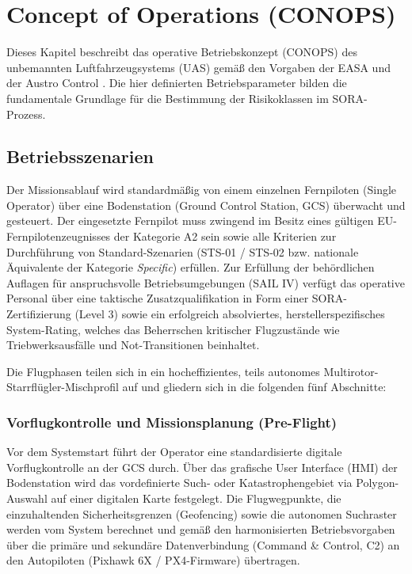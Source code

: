 ﻿\chapter{Concept of Operations (CONOPS)}
\label{ch:conops}

Dieses Kapitel beschreibt das operative Betriebskonzept (CONOPS) des unbemannten Luftfahrzeugsystems (UAS) gemäß den Vorgaben der EASA \cite{easa_rules} und der Austro Control \cite{austrocontrol_sora}. 
Die hier definierten Betriebsparameter bilden die fundamentale Grundlage für die Bestimmung der Risikoklassen im SORA-Prozess.

\section{Betriebsszenarien}
\label{sec:betriebsszenarien}

Der Missionsablauf wird standardmäßig von einem einzelnen Fernpiloten (Single Operator) über eine Bodenstation (Ground Control Station, GCS) überwacht und gesteuert. 
Der eingesetzte Fernpilot muss zwingend im Besitz eines gültigen EU-Fernpilotenzeugnisses der Kategorie A2 sein sowie alle Kriterien zur Durchführung von Standard-Szenarien 
(STS-01 / STS-02 bzw. nationale Äquivalente der Kategorie \textit{Specific}) erfüllen. Zur Erfüllung der behördlichen Auflagen für anspruchsvolle Betriebsumgebungen (SAIL IV) 
verfügt das operative Personal über eine taktische Zusatzqualifikation in Form einer SORA-Zertifizierung (Level 3) sowie ein erfolgreich absolviertes, herstellerspezifisches System-Rating, 
welches das Beherrschen kritischer Flugzustände wie Triebwerksausfälle und Not-Transitionen beinhaltet.

Die Flugphasen teilen sich in ein hocheffizientes, teils autonomes Multirotor-Starrflügler-Mischprofil auf und gliedern sich in die folgenden fünf Abschnitte:

\subsection{Vorflugkontrolle und Missionsplanung (Pre-Flight)}
Vor dem Systemstart führt der Operator eine standardisierte digitale Vorflugkontrolle an der GCS durch. 
Über das grafische User Interface (HMI) der Bodenstation wird das vordefinierte Such- oder Katastrophengebiet via Polygon-Auswahl auf einer digitalen Karte festgelegt. 
Die Flugwegpunkte, die einzuhaltenden Sicherheitsgrenzen (Geofencing) sowie die autonomen Suchraster werden vom System berechnet und gemäß den harmonisierten Betriebsvorgaben \cite{easa_rules} über die primäre und 
sekundäre Datenverbindung (Command \& Control, C2) an den Autopiloten (Pixhawk 6X / PX4-Firmware) übertragen. 

